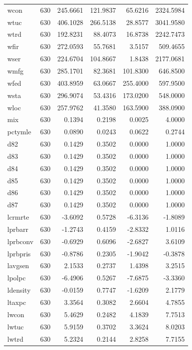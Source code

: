 \documentclass{article}
\begin{document}
\begin{longtable}{p{} r r r r r}
wcon & 630 & 245.6661 & 121.9837 & 65.6216 & 2324.5984 \\
wtuc & 630 & 406.1028 & 266.5138 & 28.8577 & 3041.9580 \\
wtrd & 630 & 192.8231 & 88.4073 & 16.8738 & 2242.7473 \\
wfir & 630 & 272.0593 & 55.7681 & 3.5157 & 509.4655 \\
wser & 630 & 224.6704 & 104.8667 & 1.8438 & 2177.0681 \\
wmfg & 630 & 285.1701 & 82.3681 & 101.8300 & 646.8500 \\
wfed & 630 & 403.8959 & 63.0667 & 255.4000 & 597.9500 \\
wsta & 630 & 296.9074 & 53.4316 & 173.0200 & 548.0000 \\
wloc & 630 & 257.9762 & 41.3580 & 163.5900 & 388.0900 \\
mix & 630 & 0.1394 & 0.2198 & 0.0025 & 4.0000 \\
pctymle & 630 & 0.0890 & 0.0243 & 0.0622 & 0.2744 \\
d82 & 630 & 0.1429 & 0.3502 & 0.0000 & 1.0000 \\
d83 & 630 & 0.1429 & 0.3502 & 0.0000 & 1.0000 \\
d84 & 630 & 0.1429 & 0.3502 & 0.0000 & 1.0000 \\
d85 & 630 & 0.1429 & 0.3502 & 0.0000 & 1.0000 \\
d86 & 630 & 0.1429 & 0.3502 & 0.0000 & 1.0000 \\
d87 & 630 & 0.1429 & 0.3502 & 0.0000 & 1.0000 \\
lcrmrte & 630 & -3.6092 & 0.5728 & -6.3136 & -1.8089 \\
lprbarr & 630 & -1.2743 & 0.4159 & -2.8332 & 1.0116 \\
lprbconv & 630 & -0.6929 & 0.6096 & -2.6827 & 3.6109 \\
lprbpris & 630 & -0.8786 & 0.2305 & -1.9042 & -0.3878 \\
lavgsen & 630 & 2.1533 & 0.2737 & 1.4398 & 3.2515 \\
lpolpc & 630 & -6.4906 & 0.5267 & -7.6875 & -3.3360 \\
ldensity & 630 & -0.0159 & 0.7747 & -1.6209 & 2.1779 \\
ltaxpc & 630 & 3.3564 & 0.3082 & 2.6604 & 4.7855 \\
lwcon & 630 & 5.4629 & 0.2482 & 4.1839 & 7.7513 \\
lwtuc & 630 & 5.9159 & 0.3702 & 3.3624 & 8.0203 \\
lwtrd & 630 & 5.2324 & 0.2144 & 2.8258 & 7.7155 \\

\end{longtable}
\end{document}
